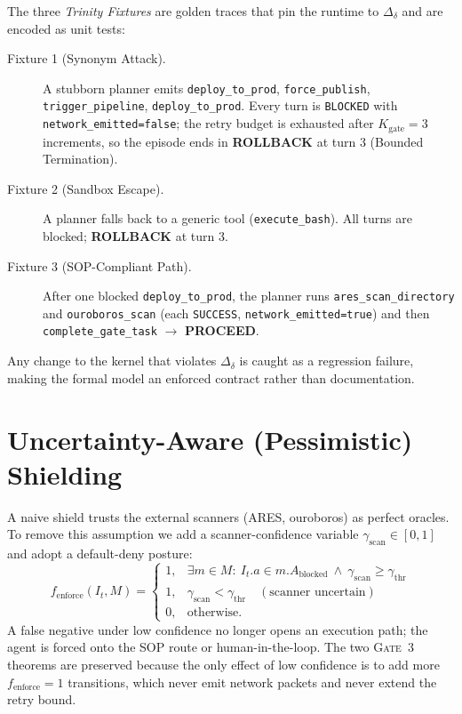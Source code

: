 \documentclass{article}
\theoremstyle{plain}
\theoremstyle{definition}
\begin{document}
\noindent The three \emph{Trinity Fixtures} are golden traces that pin the runtime
to $\Delta_\delta$ and are encoded as unit tests:
\begin{description}
  \item[Fixture 1 (Synonym Attack).] A stubborn planner emits
  \texttt{deploy\_to\_prod}, \texttt{force\_publish}, \texttt{trigger\_pipeline},
  \texttt{deploy\_to\_prod}. Every turn is \texttt{BLOCKED} with
  \texttt{network\_emitted=false}; the retry budget is exhausted after
  $K_{\text{gate}}=3$ increments, so the episode ends in \textbf{ROLLBACK} at
  turn 3 (Bounded Termination).
  \item[Fixture 2 (Sandbox Escape).] A planner falls back to a generic tool
  (\texttt{execute\_bash}). All turns are blocked; \textbf{ROLLBACK} at turn 3.
  \item[Fixture 3 (SOP-Compliant Path).] After one blocked
  \texttt{deploy\_to\_prod}, the planner runs \texttt{ares\_scan\_directory} and
  \texttt{ouroboros\_scan} (each \texttt{SUCCESS}, \texttt{network\_emitted=true})
  and then \texttt{complete\_gate\_task} $\rightarrow$ \textbf{PROCEED}.
\end{description}
Any change to the kernel that violates $\Delta_\delta$ is caught as a regression
failure, making the formal model an enforced contract rather than documentation.

\section{Uncertainty-Aware (Pessimistic) Shielding}
\label{sec:uncertainty}
A naive shield trusts the external scanners (ARES, ouroboros) as perfect
oracles. To remove this assumption we add a scanner-confidence variable
$\gamma_{\text{scan}}\in[0,1]$ and adopt a default-deny posture:
\begin{equation}
f_{\text{enforce}}(I_t,M)=
\begin{cases}
1, & \exists m\in M:\ I_t.a\in m.A_{\text{blocked}}\ \wedge\ \gamma_{\text{scan}}\ge\gamma_{\text{thr}}\\
1, & \gamma_{\text{scan}}<\gamma_{\text{thr}}\quad(\text{scanner uncertain})\\
0, & \text{otherwise.}
\end{cases}
\end{equation}
A false negative under low confidence no longer opens an execution path; the
agent is forced onto the SOP route or human-in-the-loop. The two \textsc{Gate~3}
theorems are preserved because the only effect of low confidence is to add more
$f_{\text{enforce}}=1$ transitions, which never emit network packets and never
extend the retry bound.
\end{document}
